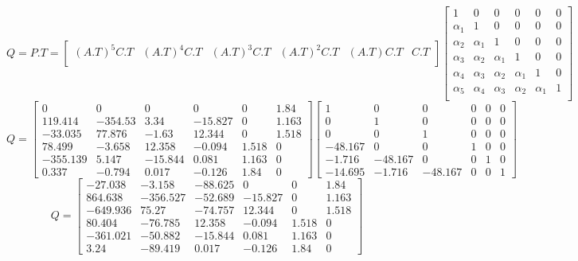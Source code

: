 \begin{equation}
 Q = P.T = 
  \begin{bmatrix}
    (A.T)^5C.T & (A.T)^4C.T & (A.T)^3C.T & (A.T)^2C.T & (A.T)C.T & C.T\\
  \end{bmatrix}
  \begin{bmatrix}
    1 & 0 & 0 & 0 & 0 & 0\\
    \alpha_1 & 1 & 0 & 0 & 0 & 0\\
    \alpha_2 & \alpha_1 & 1 & 0 & 0 & 0\\
    \alpha_3 & \alpha_2 & \alpha_1 & 1 & 0 & 0\\
    \alpha_4 & \alpha_3 & \alpha_2 & \alpha_1 & 1 & 0\\
    \alpha_5 & \alpha_4 & \alpha_3 & \alpha_2 & \alpha_1 & 1\\
  \end{bmatrix}
\end{equation}\begin{equation}
  Q = \left[\begin{matrix}0 & 0 & 0 & 0 & 0 & 1.84\\119.414 & -354.53 & 3.34 & -15.827 & 0 & 1.163\\-33.035 & 77.876 & -1.63 & 12.344 & 0 & 1.518\\78.499 & -3.658 & 12.358 & -0.094 & 1.518 & 0\\-355.139 & 5.147 & -15.844 & 0.081 & 1.163 & 0\\0.337 & -0.794 & 0.017 & -0.126 & 1.84 & 0\end{matrix}\right]\left[\begin{matrix}1 & 0 & 0 & 0 & 0 & 0\\0 & 1 & 0 & 0 & 0 & 0\\0 & 0 & 1 & 0 & 0 & 0\\-48.167 & 0 & 0 & 1 & 0 & 0\\-1.716 & -48.167 & 0 & 0 & 1 & 0\\-14.695 & -1.716 & -48.167 & 0 & 0 & 1\end{matrix}\right]
\end{equation}
\begin{equation}
  Q = \left[\begin{matrix}-27.038 & -3.158 & -88.625 & 0 & 0 & 1.84\\864.638 & -356.527 & -52.689 & -15.827 & 0 & 1.163\\-649.936 & 75.27 & -74.757 & 12.344 & 0 & 1.518\\80.404 & -76.785 & 12.358 & -0.094 & 1.518 & 0\\-361.021 & -50.882 & -15.844 & 0.081 & 1.163 & 0\\3.24 & -89.419 & 0.017 & -0.126 & 1.84 & 0\end{matrix}\right]
\end{equation}
